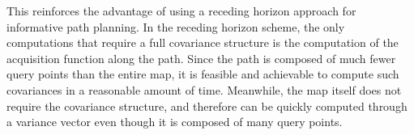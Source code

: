 			This reinforces the advantage of using a receding horizon approach for informative path planning. In the receding horizon scheme, the only computations that require a full covariance structure is the computation of the acquisition function along the path. Since the path is composed of much fewer query points than the entire map, it is feasible and achievable to compute such covariances in a reasonable amount of time. Meanwhile, the map itself does not require the covariance structure, and therefore can be quickly computed through a variance vector even though it is composed of many query points.
	

		

		
			
		
		